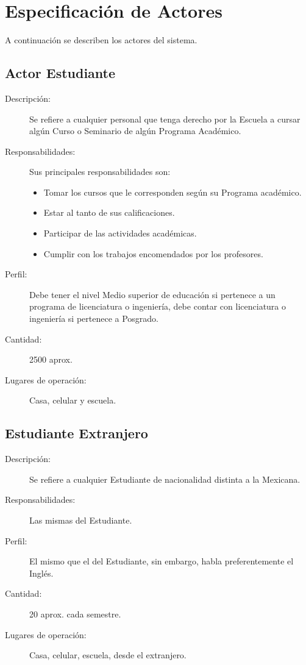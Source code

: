 \section{Especificación de Actores}

	A continuación se describen los actores del sistema.

\subsection{Actor Estudiante}

\begin{description}
	\item[Descripción: ] Se refiere a cualquier personal que tenga derecho por la Escuela a cursar algún Curso o Seminario de algún Programa Académico.
	\item[Responsabilidades: ] Sus principales responsabilidades son:
		\begin{itemize}
		 	\item Tomar los cursos que le corresponden según su Programa académico.
			\item Estar al tanto de sus calificaciones.
			\item Participar de las actividades académicas.
			\item Cumplir con los trabajos encomendados por los profesores.	
		\end{itemize}
	\item[Perfil: ] Debe tener el nivel Medio superior de educación si pertenece a un programa de licenciatura o ingeniería, debe contar con licenciatura o ingeniería si pertenece a Posgrado.
	\item[Cantidad: ] 2500 aprox.
	\item[Lugares de operación: ] Casa, celular y escuela.
\end{description}

\subsection{Estudiante Extranjero}

\begin{description}
	\item[Descripción: ] Se refiere a cualquier Estudiante de nacionalidad distinta a la Mexicana.
	\item[Responsabilidades: ] Las mismas del Estudiante.
	\item[Perfil: ] El mismo que el del Estudiante, sin embargo, habla preferentemente el Inglés.
	\item[Cantidad: ] 20 aprox. cada semestre.
	\item[Lugares de operación: ] Casa, celular, escuela, desde el extranjero.
\end{description}